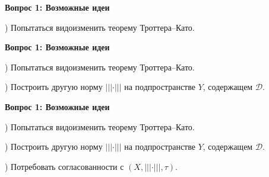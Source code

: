 \documentclass[11pt]{article}
\begin{document}
\newpage

\begin{center}
{\color{notaeYELLOW}\bfseries\fontsize{44}{52}\selectfont Вопрос 1: Возможные идеи}
\end{center}
\vspace*{\fill}
\begin{center}
\fontsize{36}{43}\selectfont
\parbox{\linewidth}{\centering{}) Попытаться видоизменить теорему Троттера--Като.
\par}\vspace{0.4in}
\end{center}
\vspace*{\fill}

\newpage

\begin{center}
{\color{notaeYELLOW}\bfseries\fontsize{44}{52}\selectfont Вопрос 1: Возможные идеи}
\end{center}
\vspace*{\fill}
\begin{center}
\fontsize{36}{43}\selectfont
\parbox{\linewidth}{\centering{}) Попытаться видоизменить теорему Троттера--Като.
\par}\vspace{0.4in}
\parbox{\linewidth}{\centering{}) Построить другую норму $|||\cdot|||$ на подпространстве $Y$, содержащем $\mathcal{D}$.
\par}\vspace{0.4in}
\end{center}
\vspace*{\fill}

\newpage

\begin{center}
{\color{notaeYELLOW}\bfseries\fontsize{44}{52}\selectfont Вопрос 1: Возможные идеи}
\end{center}
\vspace*{\fill}
\begin{center}
\fontsize{36}{43}\selectfont
\parbox{\linewidth}{\centering{}) Попытаться видоизменить теорему Троттера--Като.
\par}\vspace{0.4in}
\parbox{\linewidth}{\centering{}) Построить другую норму $|||\cdot|||$ на подпространстве $Y$, содержащем $\mathcal{D}$.
\par}\vspace{0.4in}
\parbox{\linewidth}{\centering{}) Потребовать согласованности с $(X,|||\cdot|||,\tau)$.
\par}\vspace{0.4in}
\end{center}
\vspace*{\fill}
\end{document}

